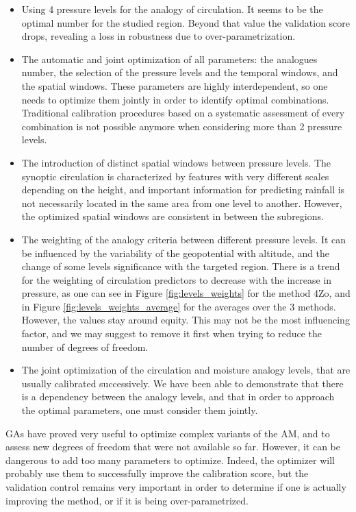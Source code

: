 \documentclass[review]{elsarticle}
\begin{document}
\begin{itemize}
	\item Using 4 pressure levels for the analogy of circulation. It seems to be the optimal number for the studied region. Beyond that value the validation score drops, revealing a loss in robustness due to over-parametrization.
	\item The automatic and joint optimization of all parameters: the analogues number, the selection of the pressure levels and the temporal windows, and the spatial windows. These parameters are highly interdependent, so one needs to optimize them jointly in order to identify optimal combinations. Traditional calibration procedures based on a systematic assessment of every combination is not possible anymore when considering more than 2 pressure levels.
	\item The introduction of distinct spatial windows between pressure levels. The synoptic circulation is characterized by features with very different scales depending on the height, and important information for predicting rainfall is not necessarily located in the same area from one level to another. However, the optimized spatial windows are consistent in between the subregions.
	\item The weighting of the analogy criteria between different pressure levels. It can be influenced by the variability of the geopotential with altitude, and the change of some levels significance with the targeted region. There is a trend for the weighting of circulation predictors to decrease with the increase in pressure, as one can see in Figure \ref{fig:levels_weights} for the method 4Zo, and in Figure \ref{fig:levels_weights_average} for the averages over the 3 methods. However, the values stay around equity. This may not be the most influencing factor, and we may suggest to remove it first when trying to reduce the number of degrees of freedom.
	\item The joint optimization of the circulation and moisture analogy levels, that are usually calibrated successively. We have been able to demonstrate that there is a dependency between the analogy levels, and that in order to approach the optimal parameters, one must consider them jointly.
\end{itemize}


GAs have proved very useful to optimize complex variants of the AM, and to assess new degrees of freedom that were not available so far. However, it can be dangerous to add too many parameters to optimize. Indeed, the optimizer will probably use them to successfully improve the calibration score, but the validation control remains very important in order to determine if one is actually improving the method, or if it is being over-parametrized.
\end{document}
